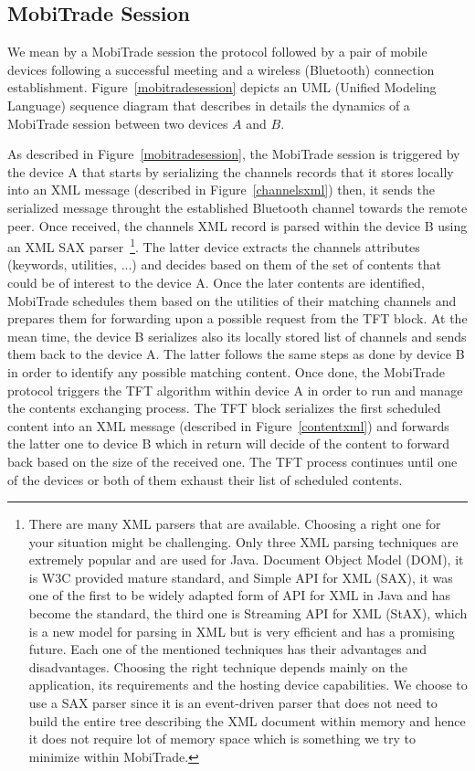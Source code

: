 \subsection{MobiTrade Session}
\label{MobiTrade-session}

We mean by a MobiTrade session the protocol followed by a pair of mobile devices following a successful meeting and a wireless (Bluetooth) connection establishment. Figure~\ref{mobitradesession} depicts an UML (Unified Modeling Language) sequence diagram that describes in details the dynamics of a MobiTrade session between two devices $A$ and $B$. 

As described in Figure~\ref{mobitradesession}, the MobiTrade session is triggered by the device A that starts by serializing the channels records that it stores locally into an XML message (described in Figure~\ref{channelsxml}) then, it sends the serialized message throught the established Bluetooth channel towards the remote peer. Once received, the channels XML record is parsed within the device B using an XML SAX parser~\footnote{There are many XML parsers that are available. Choosing a right one for your situation might be challenging. Only three XML parsing techniques are extremely popular and are used for Java. Document Object Model (DOM), it is W3C provided mature standard, and Simple API for XML (SAX), it was one of the first to be widely adapted form of API for XML in Java and has become the standard, the third one is Streaming API for XML (StAX), which is a new model for parsing in XML but is very efficient and has a promising future. Each one of the mentioned techniques has their advantages and disadvantages. Choosing the right technique depends mainly on the application, its requirements and the hosting device capabilities. We choose to use a SAX parser since it is an event-driven parser that does not need to build the entire tree describing the XML document within memory and hence it does not require lot of memory space which is something we try to minimize within MobiTrade.}. The latter device extracts the channels attributes (keywords, utilities, ...) and decides based on them of the set of contents that could be of interest to the device A. Once the later contents are identified, MobiTrade schedules them based on the utilities of their matching channels and prepares them for forwarding upon a possible request from the TFT block. At the mean time, the device B serializes also its locally stored list of channels and sends them back to the device A. The latter follows the same steps as done by device B in order to identify any possible matching content. Once done, the MobiTrade protocol triggers the TFT algorithm within device A in order to run and manage the contents exchanging process. The TFT block serializes the first scheduled content into an XML message (described in Figure~\ref{contentxml}) and forwards the latter one to device B which in return will decide of the content to forward back based on the size of the received one. The TFT process continues until one of the devices or both of them exhaust their list of scheduled contents. 

